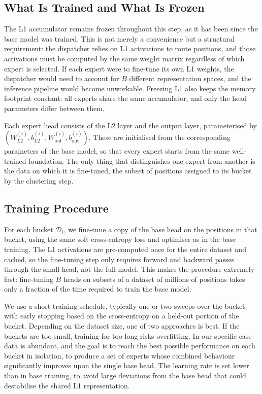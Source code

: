 \subsection{What Is Trained and What Is Frozen}\label{sec:expert-frozen}

The L1 accumulator remains frozen throughout this step, as it has been since the base model was trained. This is not merely a convenience but a structural requirement: the dispatcher relies on L1 activations to route positions, and those activations must be computed by the same weight matrix regardless of which expert is selected. If each expert were to fine-tune its own L1 weights, the dispatcher would need to account for \(B\) different representation spaces, and the inference pipeline would become unworkable. Freezing L1 also keeps the memory footprint constant: all experts share the same accumulator, and only the head parameters differ between them.

Each expert head consists of the L2 layer and the output layer, parameterised by \((W_{L2}^{(i)}, b_{L2}^{(i)}, W_{\mathrm{out}}^{(i)}, b_{\mathrm{out}}^{(i)})\). These are initialised from the corresponding parameters of the base model, so that every expert starts from the same well-trained foundation. The only thing that distinguishes one expert from another is the data on which it is fine-tuned, the subset of positions assigned to its bucket by the clustering step.

\subsection{Training Procedure}\label{sec:expert-train}

For each bucket \(\mathcal{D}_i\), we fine-tune a copy of the base head on the positions in that bucket, using the same soft cross-entropy loss and optimiser as in the base training. The L1 activations are pre-computed once for the entire dataset and cached, so the fine-tuning step only requires forward and backward passes through the small head, not the full model. This makes the procedure extremely fast: fine-tuning \(B\) heads on subsets of a dataset of millions of positions takes only a fraction of the time required to train the base model.

We use a short training schedule, typically one or two sweeps over the bucket, with early stopping based on the cross-entropy on a held-out portion of the bucket. Depending on the dataset size, one of two approaches is best. If the buckets are too small, training for too long risks overfitting. In our specific case data is abundant, and the goal is to reach the best possible performance on each bucket in isolation, to produce a set of experts whose combined behaviour significantly improves upon the single base head. The learning rate is set lower than in base training, to avoid large deviations from the base head that could destabilise the shared L1 representation.

